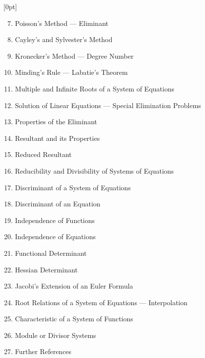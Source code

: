 \thispagestyle{fancy}

\vspace{0.5cm}


[0pt]
  {}
  {\numberline{}\makebox[1.5cm][l]{\thesubsection}}
  {}
  {\contentspage}

\fontsize{6}{0}\selectfont 
\bfseries 

\begin{enumerate}[itemsep=0pt]
    \setcounter{enumi}{6}
    \item Poisson's Method — Eliminant
    \item Cayley's and Sylvester's Method
    \item Kronecker's Method — Degree Number
    \item Minding's Rule — Labatie's Theorem
    \item Multiple and Infinite Roots of a System of Equations
    \item Solution of Linear Equations — Special Elimination Problems
    \item Properties of the Eliminant
    \item Resultant and its Properties
    \item Reduced Resultant
    \item Reducibility and Divisibility of Systems of Equations
    \item Discriminant of a System of Equations
    \item Discriminant of an Equation
    \item Independence of Functions
    \item Independence of Equations
    \item Functional Determinant
    \item Hessian Determinant
    \item Jacobi's Extension of an Euler Formula
    \item Root Relations of a System of Equations — Interpolation
    \item Characteristic of a System of Functions
    \item Module or Divisor Systems
    \item Further References
\end{enumerate}

